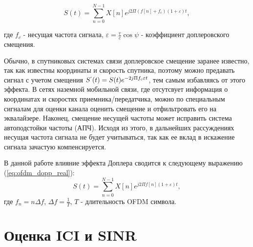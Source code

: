 \begin{equation}
    S(t) = \sum_{n = 0}^{N - 1} X[n] e^{j 2 \Pi (f[n] + f_c) (1 + \varepsilon ) t},
    \label{eq:ofdm_dopp_full}
\end{equation}

\noindent где $f_c$ - несущая частота сигнала, $\varepsilon = \frac{v}{c} \cos \psi$ - коэффициент доплеровского смещения.

Обычно, в спутниковых системах связи доплеровское смещение заранее известно, так как 
известны координаты и скорость спутника, поэтому можно предавать сигнал с учетом
смещения $S^`(t) = S(t) e^{- 2 j \Pi f_c \varepsilon t}$, тем самым избавляясь от этого эффекта.
В сетях наземной мобильной связи, где отсутсвует информация о координатах и скоростях приемника/передатчика,
можно по специальным сигналам для оценки канала оценить смещение и отфильтровать его
на эквалайзере. Наконец, смещение несущей частоты может исправить система автоподстойки частоты (АПЧ).
Исходя из этого, в дальнейших рассуждениях несущая частота сигнала не будет учитываться,
так как ее вклад в искажение сигнала зачастую компенсируется.

В данной работе влияние эффекта Доплера сводится к следующему выражению (\ref{eq:ofdm_dopp_real}):
\begin{equation}
    S(t) = \sum_{n = 0}^{N-1} X[n] e^{j 2 \Pi f[n] (1 + \varepsilon ) t},
    \label{eq:ofdm_dopp_real}
\end{equation}
\noindent где $f_n = n \Delta f$, $\Delta f = \frac{1}{T}$, $T$ - длительность OFDM символа.

\section{Оценка ICI и SINR}




